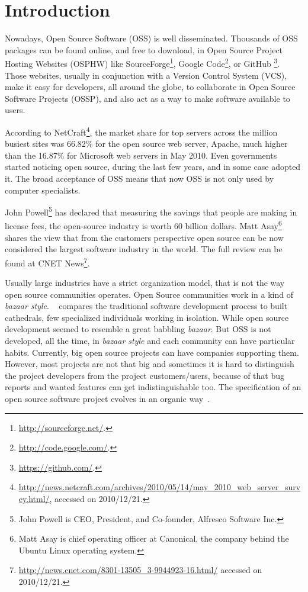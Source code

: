 \thispagestyle{empty}
\chapter{Introduction}\label{chap:introduction}


Nowadays, Open Source Software (OSS) is well disseminated.
Thousands of OSS packages can be found online, and free to download,
in Open Source Project Hosting Websites (OSPHW) like
\textsf{SourceForge}\footnote{\url{http://sourceforge.net/}.},
\textsf{Google Code}\footnote{\url{http://code.google.com/}.}, or
\textsf{GitHub     }\footnote{\url{https://github.com/}.}.
Those websites, usually in conjunction with a Version Control System (VCS), make it easy for developers, all around the globe,
to collaborate in Open Source Software Projects (OSSP), and also act as a way to make software available to users.

According to \textsf{NetCraft}\footnote{\url{http://news.netcraft.com/archives/2010/05/14/may\_2010\_web\_server\_survey.html/}, accessed on 2010/12/21.},
the market share for top servers across the million busiest sites was 66.82\% for the open source web server, Apache,
much higher than the 16.87\% for Microsoft web servers in May 2010.
Even governments started noticing open source, during the last few years, and in some case adopted it\cite{hahn2002government}.
The broad acceptance of OSS means that now OSS is not only used by computer specialists.

\textsf{John Powell}\footnote{John Powell is CEO, President, and Co-founder, Alfresco Software Inc.}
has declared that measuring the savings that people are making in license fees, the open-source industry is worth 60 billion dollars.
\textsf{Matt Asay}\footnote{Matt Asay is chief operating officer at Canonical, the company behind the Ubuntu Linux operating system.}
shares the view that from the customers perspective open source can be now considered the largest software industry in the world.
The full review can be found at \textsf{CNET News}\footnote{\url{http://news.cnet.com/8301-13505\_3-9944923-16.html/} accessed on 2010/12/21.}.

Usually large industries have a strict organization model, that is not the way open source communities operates.
Open Source communities work in a kind of \textit{bazaar style}.
~\cite{raymondcathedral} compares the traditional software development process to built cathedrals,
few specialized individuals working in isolation.
While open source development seemed to resemble a great babbling \textit{bazaar}.
But OSS is not developed, all the time, in \textit{bazaar style} and each community can have particular habits.
Currently, big open source projects can have companies supporting them.
However, most projects are not that big and sometimes it is hard to distinguish the project developers from the project customers/users,
because of that bug reports and wanted features can get indistinguishable too.
The specification of an open source software project evolves in an organic way~\cite{capiluppicathedral}.

